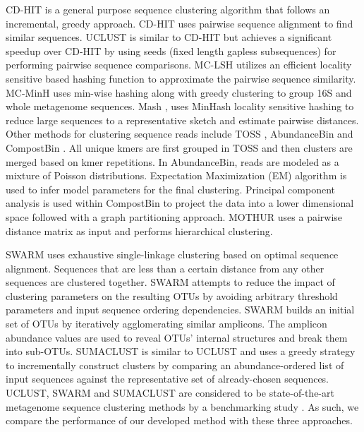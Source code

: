 \documentclass[10pt, conference, compsocconf]{IEEEtran}
\begin{document}
CD-HIT \cite{MARCDhit} is a 
general purpose sequence clustering algorithm that 
follows an incremental, greedy approach. CD-HIT uses 
pairwise sequence alignment to find similar 
sequences. UCLUST \cite{MARuclust} is similar to CD-HIT but 
achieves a significant speedup over CD-HIT by using seeds (fixed length gapless subsequences) for 
performing pairwise sequence comparisons. MC-LSH \cite{MARMetaLSH} utilizes 
an efficient locality sensitive based hashing function to 
approximate the pairwise sequence similarity. MC-MinH \cite{MARMcMinH} uses 
min-wise \cite{MARMinWise} hashing along with 
greedy clustering to group 16S and whole metagenome sequences. Mash \cite{MAROtherMinH}, uses MinHash 
locality sensitive hashing 
to reduce large sequences to a representative sketch and 
estimate
pairwise distances. Other methods for clustering sequence 
reads include TOSS \cite{MARToss}, AbundanceBin \cite{MARAbundant} and CompostBin \cite{MARCompost}. All unique 
kmers are first grouped in TOSS and then clusters are merged 
based on kmer repetitions. In AbundanceBin, reads are modeled as a 
mixture of Poisson distributions. Expectation Maximization (EM) algorithm 
is used to infer model parameters for the final clustering. Principal 
component analysis is used within CompostBin to project the data into a 
lower dimensional space
followed with a graph partitioning approach. MOTHUR \cite{MARMothur} uses a pairwise distance matrix as 
input and performs hierarchical clustering. 

%
SWARM \cite{MARSwarm2} uses exhaustive single-linkage clustering 
based on optimal sequence alignment. Sequences that are less than 
a certain distance from any other sequences are 
clustered together. SWARM attempts to reduce the impact of clustering 
parameters on the resulting OTUs by avoiding arbitrary 
threshold parameters 
and input sequence ordering dependencies. SWARM builds 
an initial set of OTUs  by 
iteratively agglomerating similar amplicons. The amplicon abundance values are used to reveal 
OTUs’ internal structures and 
break them into sub-OTUs.
%
SUMACLUST \cite{MARSumaclust} is similar to UCLUST and uses 
a  greedy strategy to 
incrementally construct clusters by comparing an 
abundance-ordered list of input sequences against the 
representative set of already-chosen sequences.  UCLUST, SWARM and SUMACLUST are 
considered to be 
state-of-the-art metagenome sequence clustering methods by a 
benchmarking study \cite{MARopenDeNovo}.  As such, we compare the performance of our developed method with these three approaches. 
\end{document}
